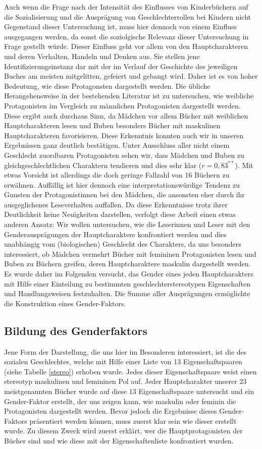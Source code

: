 Auch wenn die Frage nach der Intensität des Einflusses von Kinderbüchern
auf die Sozialisierung und die Ausprägung von Geschlechterrollen bei
Kindern nicht Gegenstand dieser Untersuchung ist, muss hier dennoch von
einem Einfluss ausgegangen werden, da sonst die soziolgische Relevanz
dieser Untersuchung in Frage gestellt würde. Dieser Einfluss geht vor
allem von den Hauptcharakteren und deren Verhalten, Handeln und Denken
aus. Sie stellen jene Identifizierungsinstanz dar mit der im Verlauf der
Geschichte des jeweiligen Buches am meisten mitgelitten, gefeiert und
gebangt wird. Daher ist es von hoher Bedeutung, wie diese Protagonsten
dargestellt werden. Die übliche Herangehensweise in der bestehenden
Literatur ist zu untersuchen, wie weibliche Protagonisten im Vergleich
zu männlichen Protagonisten dargestellt werden. Diese ergibt auch
durchaus Sinn, da Mädchen vor allem Bücher mit weiblichen
Hauptcharakteren lesen und Buben besonders Bücher mit maskulinen
Hauptcharakteren favorisieren. Diese Erkenntnis konnten auch wir in
unseren Ergebnissen ganz deutlich bestätigen. Unter Ausschluss aller
nicht einem Geschlecht zuordbaren Protagonisten sehen wir, dass Mädchen
und Buben zu gleichgeschlechtlichen Charaktern tendieren und dies sehr
klar ($r= 0{,}83^{**}$). Mit etwas Vorsicht ist allerdings die doch
geringe Fallzahl von 16 Büchern zu erwähnen. Auffällig ist hier dennoch
eine interpretationswürdige Tendenz zu Gunsten der Protagonistinnen bei
den Mädchen, die ansonsten eher durch ihr ausgeglichenes Leseverhalten
auffallen. Da diese Erkenntnisse trotz ihrer Deutlichkeit keine
Neuigkeiten darstellen, verfolgt diese Arbeit einen etwas anderen
Ansatz: Wir wollen untersuchen, wie die Leserinnen und Leser mit den
Genderausprägungen der Hauptcharaktere konfrontiert werden und dies
unabhängig vom (biologischen) Geschlecht des Charakters, da uns
besonders interessiert, ob Mädchen vermehrt Bücher mit femininen
Protagonisten lesen und Buben zu Büchern greifen, deren Hauptcharaktere
maskulin dargestellt werden. Es wurde daher im Folgenden versucht, das
Gender eines jeden Hauptcharakters mit Hilfe einer Einteilung zu
bestimmten geschlechterstereotypen Eigenschaften und Handlungsweisen
festzuhalten. Die Summe aller Ausprägungen ermöglichte die Konstruktion
eines Gender-Faktors.

\subsection{Bildung des Genderfaktors}

Jene Form der Darstellung, die uns hier im Besonderen interessiert, ist
die des sozialen Geschlechtes, welche mit Hilfe einer Liste von 13
Eigenschaftspaaren (siehe Tabelle \ref{stereo}) erhoben wurde. Jedes
dieser Eigenschaftspaare weist einen stereotyp maskulinen und femininen
Pol auf. Jeder Hauptcharakter unserer 23 meistgenannten Bücher wurde auf
diese 13 Eigenschaftspaare untersucht und ein Gender-Faktor erstellt,
der uns zeigen kann, wie maskulin oder feminin die Protagonisten
dargestellt werden. Bevor jedoch die Ergebnisse dieses Gender-Faktors
präsentiert werden können, muss zuerst klar sein wie dieser erstellt
wurde. Zu diesem Zweck wird zuerst erklärt, wer die Hauptprotagonisten
der Bücher sind und wie diese mit der Eigenschaftenliste konfrontiert
wurden.

